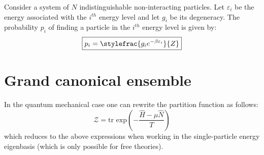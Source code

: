 	Consider a system of $N$ indistinguishable non-interacting particles. Let $\varepsilon_i$ be the energy associated with the $i^{th}$ energy level and let $g_i$ be its degeneracy. The probability $p_i$ of finding a particle in the $i^{th}$ energy level is given by:
    	\begin{equation}
		\boxed{p_i = \stylefrac{g_i e^{-\beta\varepsilon_i}}{Z}}
	\end{equation}
	

\section{Grand canonical ensemble}
    
        
        
        
        \begin{formula}[Quantum]
        	In the quantum mechanical case one can rewrite the partition function as follows:
        	\begin{equation}
        		\mathcal{Z} = \text{tr exp}\left(-\frac{\hat{H}-\mu\hat{N}}{T}\right)
        	\end{equation}
        	which reduces to the above expressions when working in the single-particle energy eigenbasis (which is only possible for free theories).
        \end{formula}
        
